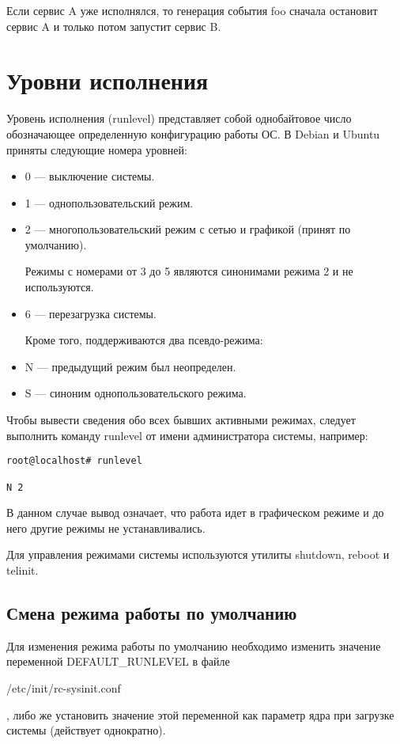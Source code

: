 Если сервис A уже исполнялся, то генерация события foo сначала остановит сервис A и только потом запустит сервис B.
\section{Уровни исполнения} \label{sec:runlevel}
Уровень исполнения (runlevel) представляет собой однобайтовое число обозначающее определенную конфигурацию работы ОС. В Debian и Ubuntu приняты следующие номера уровней: \begin{itemize}
\item 0 --- выключение системы.
\item 1 --- однопользовательский режим.
\item 2 --- многопользовательский режим с сетью и графикой (принят по умолчанию).

Режимы с номерами от 3 до 5 являются синонимами режима 2 и не используются.
\item 6 --- перезагрузка системы.

Кроме того, поддерживаются два псевдо-режима:
\item N --- предыдущий режим был неопределен.
\item S --- синоним однопользовательского режима.
\end{itemize}

Чтобы вывести сведения обо всех бывших активными режимах, следует выполнить команду runlevel от имени администратора системы, например: \begin{verbatim}
root@localhost# runlevel

N 2
\end{verbatim}
В данном случае вывод означает, что работа идет в графическом режиме и до него другие режимы не устанавливались. 

Для управления режимами системы используются утилиты shutdown, reboot и telinit.
\subsection{Смена режима работы по умолчанию}
Для изменения режима работы по умолчанию необходимо изменить значение переменной DEFAULT\_RUNLEVEL в файле \begin{verbatim*}
/etc/init/rc-sysinit.conf
\end{verbatim*}, либо же установить значение этой переменной как параметр ядра при загрузке системы (действует однократно).